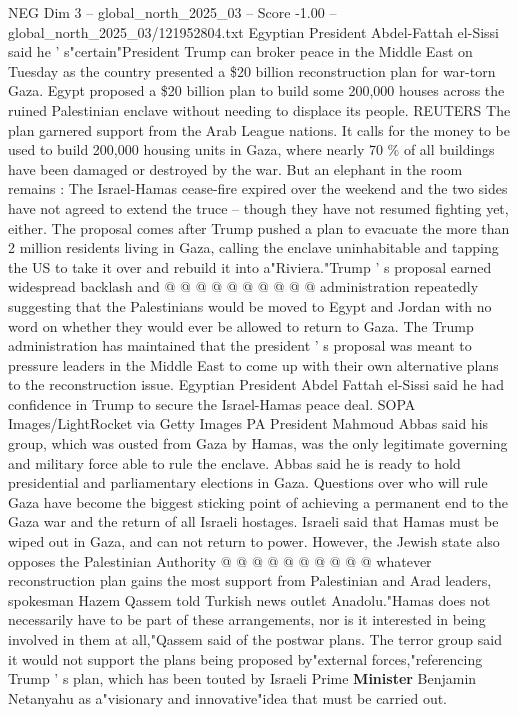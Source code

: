 \begin{textsample}{NEG Dim 3 – global\_north\_2025\_03 – Score -1.00 – global\_north\_2025\_03/121952804.txt}  \label{ex:f3_neg_432}
Egyptian President Abdel-Fattah el-Sissi said he ' s"certain"President Trump can broker peace in the Middle East on Tuesday as the country presented a \$20 billion reconstruction plan for war-torn Gaza.
Egypt proposed a \$20 billion plan to build some 200,000 houses across the ruined Palestinian enclave without needing to displace its people.
REUTERS The plan garnered support from the Arab League nations.
It calls for the money to be used to build 200,000 housing units in Gaza, where nearly 70 \% of all buildings have been damaged or destroyed by the war.
But an elephant in the room remains : The Israel-Hamas cease-fire expired over the weekend and the two sides have not agreed to extend the truce -- though they have not resumed fighting yet, either.
The proposal comes after Trump pushed a plan to evacuate the more than 2 million residents living in Gaza, calling the enclave uninhabitable and tapping the US to take it over and rebuild it into a"Riviera."Trump ' s proposal earned widespread backlash and @ @ @ @ @ @ @ @ @ @ administration repeatedly suggesting that the Palestinians would be moved to Egypt and Jordan with no word on whether they would ever be allowed to return to Gaza.
The Trump administration has maintained that the president ' s proposal was meant to pressure leaders in the Middle East to come up with their own alternative plans to the reconstruction issue.
Egyptian President Abdel Fattah el-Sissi said he had confidence in Trump to secure the Israel-Hamas peace deal.
SOPA Images/LightRocket via Getty Images PA President Mahmoud Abbas said his group, which was ousted from Gaza by Hamas, was the only legitimate governing and military force able to rule the enclave.
Abbas said he is ready to hold presidential and parliamentary elections in Gaza.
Questions over who will rule Gaza have become the biggest sticking point of achieving a permanent end to the Gaza war and the return of all Israeli hostages.
Israeli said that Hamas must be wiped out in Gaza, and can not return to power.
However, the Jewish state also opposes the Palestinian Authority @ @ @ @ @ @ @ @ @ @ whatever reconstruction plan gains the most support from Palestinian and Arad leaders, spokesman Hazem Qassem told Turkish news outlet Anadolu."Hamas does not necessarily have to be part of these arrangements, nor is it interested in being involved in them at all,"Qassem said of the postwar plans.
The terror group said it would not support the plans being proposed by"external forces,"referencing Trump ' s plan, which has been touted by Israeli Prime \textbf{Minister} Benjamin Netanyahu as a"visionary and innovative"idea that must be carried out.

\end{textsample}
